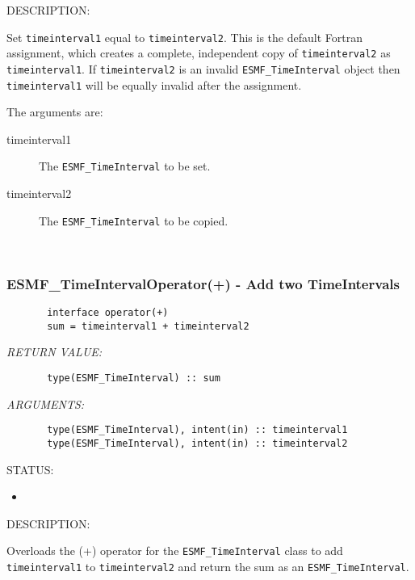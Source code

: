 {\sf DESCRIPTION:\\ }


       \begin{sloppypar}
       Set {\tt timeinterval1} equal to {\tt timeinterval2}.  This is the default
       Fortran assignment, which creates a complete, independent copy of
       {\tt timeinterval2} as {\tt timeinterval1}.  If {\tt timeinterval2} is an
       invalid {\tt ESMF\_TimeInterval} object then {\tt timeinterval1} will be
       equally invalid after the assignment.
       \end{sloppypar}
  
       The arguments are:
       \begin{description} 
       \item[timeinterval1] 
            The {\tt ESMF\_TimeInterval} to be set.
       \item[timeinterval2] 
            The {\tt ESMF\_TimeInterval} to be copied.
       \end{description}
   
 
\mbox{}\hrulefill\ 
 
\subsubsection [ESMF\_TimeIntervalOperator(+)] {ESMF\_TimeIntervalOperator(+) - Add two TimeIntervals}


  
\begin{verbatim}       interface operator(+)
       sum = timeinterval1 + timeinterval2\end{verbatim}{\em RETURN VALUE:}
\begin{verbatim}       type(ESMF_TimeInterval) :: sum\end{verbatim}{\em ARGUMENTS:}
\begin{verbatim}       type(ESMF_TimeInterval), intent(in) :: timeinterval1
       type(ESMF_TimeInterval), intent(in) :: timeinterval2\end{verbatim}
{\sf STATUS:}
   \begin{itemize}
   \item{}
   \end{itemize}
  
{\sf DESCRIPTION:\\ }


       Overloads the (+) operator for the {\tt ESMF\_TimeInterval} class to
       add {\tt timeinterval1} to {\tt timeinterval2} and return the
       sum as an {\tt ESMF\_TimeInterval}.
  
